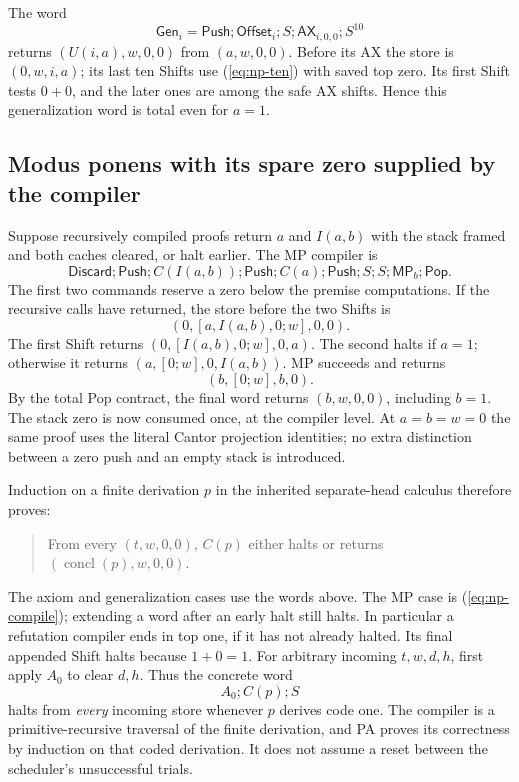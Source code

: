 The word
\[
 \mathsf{Gen}_i=\mathsf{Push};\mathsf{Offset}_i;S;
                \mathsf{AX}_{i,0,0};S^{10}
\]
returns $(U(i,a),w,0,0)$ from $(a,w,0,0)$. Before its AX the store is
$(0,w,i,a)$; its last ten Shifts use (\ref{eq:np-ten}) with saved top zero.
Its first Shift tests $0+0$, and the later ones are among the safe AX
shifts. Hence this generalization word is total even for $a=1$.

\subsection{Modus ponens with its spare zero supplied by the compiler}

Suppose recursively compiled proofs return $a$ and $I(a,b)$ with the
stack framed and both caches cleared, or halt earlier. The MP compiler is
\begin{equation}\label{eq:np-compile}
 \mathsf{Discard};\mathsf{Push};C(I(a,b));\mathsf{Push};
 C(a);\mathsf{Push};S;S;\mathsf{MP}_b;\mathsf{Pop}.
\end{equation}
The first two commands reserve a zero below the premise computations.
If the recursive calls have returned, the store before the two Shifts is
\[
             (0,[a,I(a,b),0;w],0,0).
\]
The first Shift returns $(0,[I(a,b),0;w],0,a)$.
The second halts if $a=1$; otherwise it returns
$(a,[0;w],0,I(a,b))$. MP succeeds and returns
\[
                         (b,[0;w],b,0).
\]
By the total Pop contract, the final word returns $(b,w,0,0)$, including
$b=1$. The stack zero is now consumed once, at the compiler level.
At $a=b=w=0$ the same proof uses the literal Cantor projection identities;
no extra distinction between a zero push and an empty stack is introduced.

Induction on a finite derivation $p$ in the inherited separate-head
calculus therefore proves:
\begin{quote}
From every $(t,w,0,0)$, $C(p)$ either halts or returns
$(\operatorname{concl}(p),w,0,0)$.
\end{quote}
The axiom and generalization cases use the words above. The MP case is
(\ref{eq:np-compile}); extending a word after an early halt still halts.
In particular a refutation compiler ends in top one, if it has not already
halted. Its final appended Shift halts because $1+0=1$.
For arbitrary incoming $t,w,d,h$, first apply $A_0$ to clear $d,h$.
Thus the concrete word
\[
                         A_0;C(p);S
\]
halts from \emph{every} incoming store whenever $p$ derives code one.
The compiler is a primitive-recursive traversal of the finite derivation,
and PA proves its correctness by induction on that coded derivation.
It does not assume a reset between the scheduler's unsuccessful trials.

